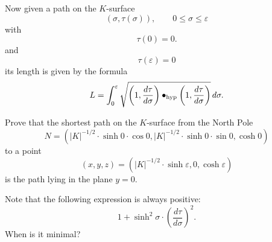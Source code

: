\documentclass{ximera}
\begin{document}
 Now given a path on the $K$-surface
 \[
 \left(\sigma,\tau(\sigma)\right),\qquad0\leq\sigma \leq\varepsilon
 \]
 with
 \[
 \tau\left(  0\right)  =0.
 \]
 and%
 \[
 \tau\left(  \varepsilon\right)  =0
 \]
 its length is given by the formula%
\[
L=\int_{0}^{\varepsilon} \sqrt{\left(1,\dd[\tau]{\sigma}\right)\bullet_\mathrm{hyp} \left(1,\dd[\tau]{\sigma}\right)}\d\sigma.
\]

\begin{problem}
  Prove that the shortest path on the $K$-surface from the North Pole
  \[
  N=\left( |K|^{-1/2}\cdot \sinh 0\cdot  \cos 0,|K|^{-1/2}\cdot \sinh  0\cdot \sin 0,\cosh
  0\right)
  \]
  to a point
  \[
  (x,y,z)=\left(|K|^{-1/2}\cdot \sinh \varepsilon,0,\cosh \varepsilon\right)
  \]
  is the path lying in the plane $y=0$.
  \begin{hint}
    Note that the following expression is always positive:
    \[
    1+\sinh^{2}\sigma\cdot \left(\frac{d\tau }{d\sigma}\right)^{2}.
    \]
    When is it minimal?
  \end{hint}


\end{problem}
\end{document}
